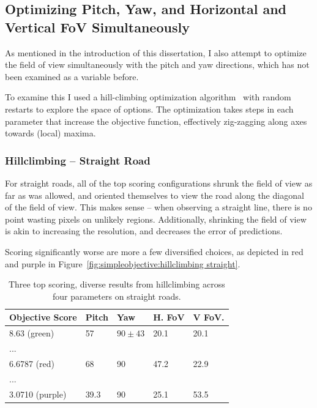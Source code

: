 \documentclass[a4paper,12pt,twoside,openright]{report}
\begin{document}


\subsection{Optimizing Pitch, Yaw, and Horizontal and Vertical FoV Simultaneously}
\label{sec:simpleobjective:hillclimbing}

As mentioned in the introduction of this dissertation, I also attempt
to optimize the field of view simultaneously with the pitch and yaw
directions, which has not been examined as a variable before.

To examine this I used a hill-climbing optimization algorithm~\cite{russel2016artificial}
with random restarts to explore the space of options. The optimization
takes steps in each parameter that increase the objective function, effectively
zig-zagging along axes towards (local) maxima.

\subsubsection{Hillclimbing -- Straight Road}

For straight roads, all of the top scoring configurations 
shrunk the field of view as far as was allowed, and oriented themselves to
view the road along the diagonal of the field of view. This makes sense -- 
when observing a straight line, there is no point wasting pixels
on unlikely regions. Additionally, shrinking the field
of view is akin to increasing the resolution, and decreases
the error of predictions. 

Scoring significantly worse are more a few diversified choices,
as depicted in red and purple in Figure~\ref{fig:simpleobjective:hillclimbing straight}.

\begin{table}[htb]
    \centering
    \caption[Hillclimbing Top Scorers]{Three top scoring, diverse results from hillclimbing across four parameters on straight roads.}
    \label{tab:simpleobjective:hillclimb}
    \begin{tabular}{@{}lllll@{}}
        \toprule
        Objective Score & Pitch & Yaw   & H. FoV & V FoV. \\ \midrule
        8.63 (green)            & 57 & $90\pm43$ & 20.1  & 20.1  \\
        ... \\
        6.6787 (red)          & 68 & 90 & 47.2  & 22.9 \\
        ... \\
        3.0710 (purple)          & 39.3 & 90 & 25.1  & 53.5  \\ 
        \bottomrule
    \end{tabular}
\end{table}
\end{document}
